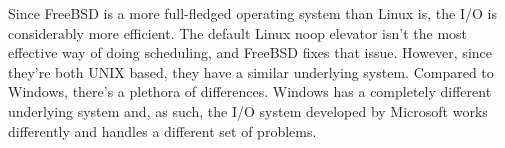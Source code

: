 \documentclass[draftclsnofoot,onecolumn,journal,letterpaper,10pt]{IEEEtran}
\begin{document}
Since FreeBSD is a more full-fledged operating system than Linux is, the I/O is considerably more efficient. The default Linux noop elevator isn't the most effective way of doing scheduling, and FreeBSD fixes that issue. However, since they're both UNIX based, they have a similar underlying system. Compared to Windows, there's a plethora of differences. Windows has a completely different underlying system and, as such, the I/O system developed by Microsoft works differently and handles a different set of problems. 
  
\pagebreak
\nocite{*} %


\end{document}
